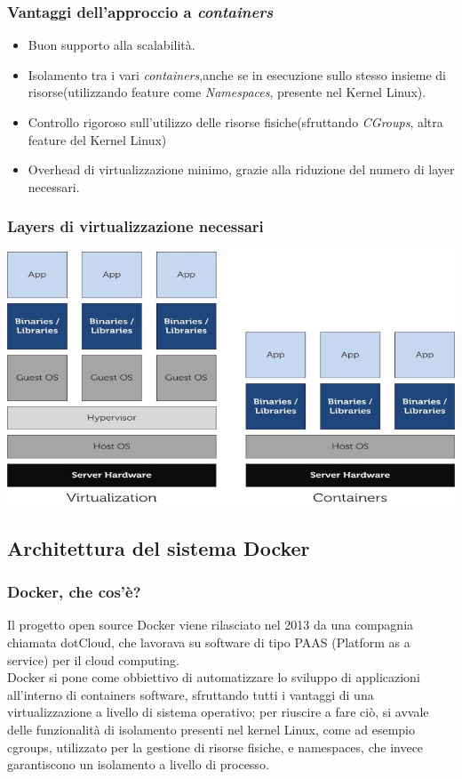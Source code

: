 \documentclass{beamer}
\begin{document}

\begin{frame}
\frametitle{Vantaggi dell'approccio a  \textit{containers}}
\begin{itemize}
\item Buon supporto alla scalabilità.
\item Isolamento tra i vari  \textit{containers},anche se in esecuzione sullo stesso insieme di risorse(utilizzando feature come  \textit{Namespaces}, presente nel Kernel Linux).
\item Controllo rigoroso sull'utilizzo delle risorse fisiche(sfruttando \textit{CGroups}, altra feature del Kernel Linux)
\item Overhead di virtualizzazione minimo, grazie alla riduzione del numero di layer necessari.
\end{itemize}
\end{frame}

\begin{frame}
\frametitle{Layers di virtualizzazione necessari}
\includegraphics[width=\textwidth]{pic1}
\end{frame}


\subsection{Architettura del sistema Docker} %

\begin{frame}
\frametitle{Docker, che cos'è?}
Il progetto open source Docker viene rilasciato nel 2013 da una compagnia chiamata dotCloud, che lavorava su software di tipo PAAS (Platform as a service) per il cloud computing.\\
Docker si pone come obbiettivo di automatizzare lo sviluppo di applicazioni all’interno di containers software, sfruttando tutti i vantaggi di una virtualizzazione a livello di sistema operativo; per riuscire a fare ciò, si avvale delle funzionalità di isolamento presenti nel kernel Linux, come ad esempio cgroups, utilizzato per la gestione di risorse fisiche, e namespaces, che invece garantiscono un isolamento a livello di processo.
\end{frame}
\end{document}
